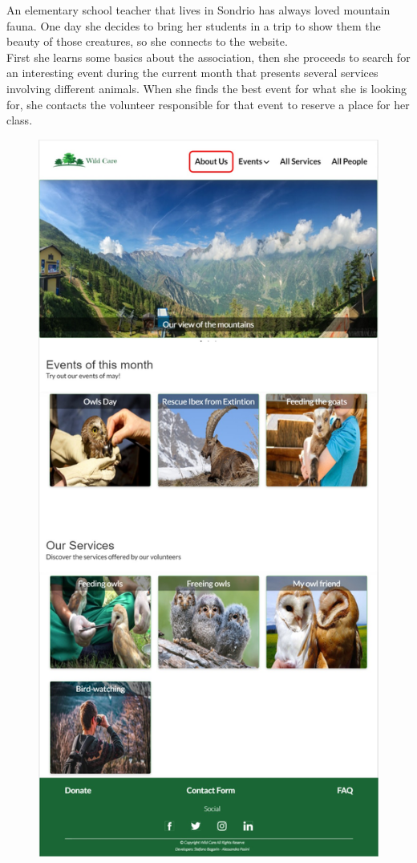 An elementary school teacher that lives in Sondrio has always loved mountain fauna. One day she decides to bring her students in a trip to show them the beauty of those creatures, so she connects to the website.\\
First she learns some basics about the association, then she proceeds to search for an interesting event during the current month that presents several services involving different animals. When she finds the best event for what she is looking for, she contacts the volunteer responsible for that event to reserve a place for her class.
	\begin{figure}[h!]
		\centering
		\begin{minipage}[b]{0.8\textwidth}
    			\includegraphics[width= \textwidth]{./assets/mockups/homepage_aboutus.jpg}

\end{minipage}
\end{figure}
